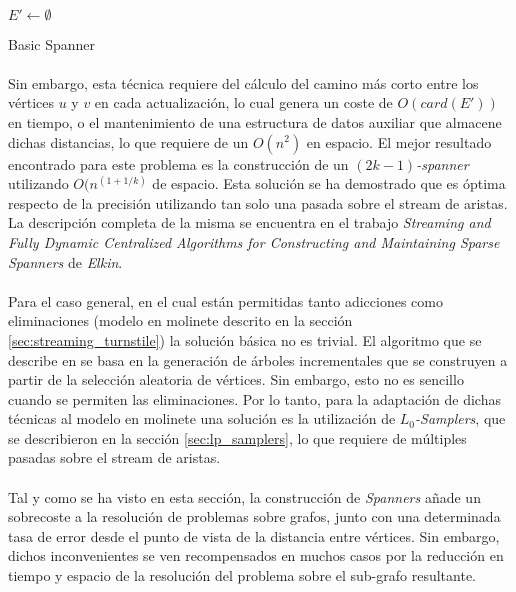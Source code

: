 \documentclass{subfiles}
\begin{document}
        \paragraph{}
        \begin{algorithm}
          \SetAlgoLined
          $E' \gets \emptyset$\;
          \caption{Basic Spanner}
          \label{code:basic_spanner}
        \end{algorithm}

        \paragraph{}
        Sin embargo, esta técnica requiere del cálculo del camino más corto entre los vértices $u$ y $v$ en cada actualización, lo cual genera un coste de $O(card(E'))$ en tiempo, o el mantenimiento de una estructura de datos auxiliar que almacene dichas distancias, lo que requiere de un $O(n^2)$ en espacio. El mejor resultado encontrado para este problema es la construcción de un \emph{$(2k-1)$-spanner} utilizando $O(n^(1+1/k)$ de espacio. Esta solución se ha demostrado que es óptima respecto de la precisión utilizando tan solo una pasada sobre el stream de aristas. La descripción completa de la misma se encuentra en el trabajo \emph{Streaming and Fully Dynamic Centralized Algorithms for Constructing and Maintaining Sparse Spanners} \cite{elkin2007streaming} de \emph{Elkin}.

        \paragraph{}
        Para el caso general, en el cual están permitidas tanto adicciones como eliminaciones (modelo en molinete descrito en la sección \ref{sec:streaming_turnstile}) la solución básica no es trivial. El algoritmo que se describe en \cite{elkin2007streaming} se basa en la generación de árboles incrementales que se construyen a partir de la selección aleatoria de vértices. Sin embargo, esto no es sencillo cuando se permiten las eliminaciones. Por lo tanto, para la adaptación de dichas técnicas al modelo en molinete una solución es la utilización de \emph{$L_0$-Samplers}, que se describieron en la sección \ref{sec:lp_samplers}, lo que requiere de múltiples pasadas sobre el stream de aristas.

        \paragraph{}
        Tal y como se ha visto en esta sección, la construcción de \emph{Spanners} añade un sobrecoste a la resolución de problemas sobre grafos, junto con una determinada tasa de error desde el punto de vista de la distancia entre vértices. Sin embargo, dichos inconvenientes se ven recompensados en muchos casos por la reducción en tiempo y espacio de la resolución del problema sobre el sub-grafo resultante.
\end{document}
